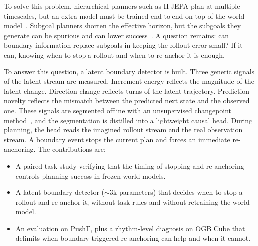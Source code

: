\documentclass[conference]{IEEEtran}
\begin{document}
To solve this problem, hierarchical planners such as H-JEPA plan at multiple timescales, but
an extra model must be trained end-to-end on top of the world model~\cite{hjepa2026}. Subgoal
planners shorten the effective horizon, but the subgoals they generate can be spurious and can
lower success~\cite{mindthegap2026}. A question remains: can boundary information replace
subgoals in keeping the rollout error small? If it can, knowing when to stop a rollout and
when to re-anchor it is enough.

To answer this question, a latent boundary detector is built. Three generic signals of the
latent stream are measured. Increment energy reflects the magnitude of the latent change.
Direction change reflects turns of the latent trajectory. Prediction novelty reflects the
mismatch between the predicted next state and the observed one. These signals are segmented
offline with an unsupervised changepoint method~\cite{killick2012pelt}, and the segmentation
is distilled into a lightweight causal head. During planning, the head
reads the imagined rollout stream and the real observation stream. A boundary event stops the
current plan and forces an immediate re-anchoring. The contributions are:
\begin{itemize}
\item A paired-task study verifying that the timing of stopping and re-anchoring controls
planning success in frozen world models.
\item A latent boundary detector (${\sim}3$k parameters) that decides when to stop a
rollout and re-anchor it, without task rules and without retraining the world model.
\item An evaluation on PushT, plus a rhythm-level diagnosis on OGB Cube that delimits
when boundary-triggered re-anchoring can help and when it cannot.
\end{itemize}
\end{document}
